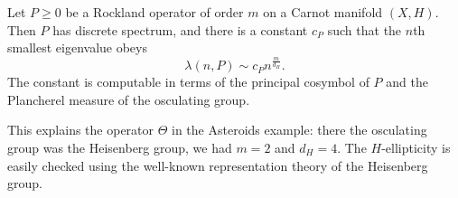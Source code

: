 \documentclass{beamer}
\numberwithin{equation}{section}
\theoremstyle{plain}
\theoremstyle{plain}
\theoremstyle{definition}
\theoremstyle{plain}
\theoremstyle{plain}
\theoremstyle{definition}
\begin{document}
\begin{frame}
\begin{theorem}
  Let $P\geq 0$ be a Rockland operator of order $m$ on a Carnot manifold $(X,H).$ Then $P$ has discrete spectrum, and there is a constant $c_P$ such that the $n$th smallest eigenvalue obeys
  \[
      \lambda(n,P) \sim c_Pn^{\frac{m}{d_H}}.
  \]
  The constant is computable in terms of the principal cosymbol of $P$ and the Plancherel measure of the osculating group.
\end{theorem}
This explains the operator $\Theta$ in the Asteroids example: there the osculating group was the Heisenberg group, we had $m=2$ and $d_H=4.$ The $H$-ellipticity is easily checked using the well-known representation theory of the Heisenberg group.
\end{frame}


\begin{frame}
\end{frame}
\end{document}

